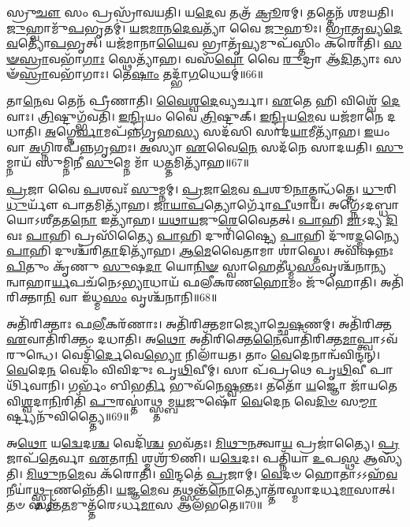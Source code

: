 𑌸𑍍𑌰𑍁\-\ul{𑌚𑍗} 𑌸𑌂 𑌪𑍍𑌰𑌸𑍍𑌰𑌾᳴𑌵𑌯𑌤𑌿।
𑌯\-\ul{𑌦𑍇}\-𑌵 𑌤𑌤𑍍𑌰᳴ \ul{𑌕𑍍𑌰𑍂}\-𑌰𑌮𑍍।
𑌤𑌤𑍍𑌤𑍇𑌨᳴ 𑌶𑌮𑌯𑌤𑌿।
\-\ul{𑌜𑍁}\-𑌹𑍍𑌵𑌾𑌮𑍁᳴\-\ul{𑌪}\-𑌭𑍃𑌤𑌮𑍍॑।
\-\ul{𑌯}\-\-\ul{𑌜}\-\-\ul{𑌮𑌾}\-\-\ul{𑌨}\-\-\ul{𑌦𑍇}\-\-\ul{𑌵}\-𑌤𑍍𑌯𑌾᳴ 𑌵𑍈 \ul{𑌜𑍁}\-𑌹𑍂𑌃।
\-\ul{𑌭𑍍𑌰𑌾}\-\-\ul{𑌤𑍃}\-\-\ul{𑌵𑍍𑌯}\-\-\ul{𑌦𑍇}\-\-\ul{𑌵}\-𑌤𑍍𑌯𑍋᳴\-\ul{𑌪}\-𑌭𑍃𑌤𑍍।
𑌯𑌜᳴𑌮𑌾𑌨𑌾\-\ul{𑌯𑍈}\-𑌵 𑌭𑍍𑌰𑌾𑌤𑍃᳴\-\ul{𑌵𑍍𑌯}\-𑌮𑍁𑌪᳴𑌸𑍍𑌤𑌿𑌂 𑌕𑌰𑍋𑌤𑌿।
\-\ul{𑌸}\-\-\ul{𑍟}\-\-\ul{𑌸𑍍𑌰𑌾}\-𑌵𑌭𑌾᳴\-\ul{𑌗𑌾𑌃} 𑌸𑍍𑌥𑍇𑌤𑍍𑌯𑌾᳴𑌹।
𑌵𑌸᳴\-\ul{𑌵𑍋} 𑌵𑍈 \ul{𑌰𑍁}\-𑌦𑍍𑌰𑌾 𑌆᳴\-\ul{𑌦𑌿}\-𑌤𑍍𑌯𑌾𑌃 𑌸𑍟᳴\-\ul{𑌸𑍍𑌰𑌾}\-𑌵𑌭𑌾᳴𑌗𑌾𑌃।
𑌤𑍇\-\ul{𑌷𑌾𑌂} 𑌤𑌦𑍍𑌭𑌾᳴\-\ul{𑌗}\-𑌧𑍇𑌯𑌮𑍍॑॥66॥

𑌤𑌾\-\ul{𑌨𑍇}\-𑌵 𑌤𑍇𑌨᳴ 𑌪𑍍𑌰𑍀𑌣𑌾𑌤𑌿।
\-\ul{𑌵𑍈}\-\-\ul{𑌶𑍍𑌵}\-\-\ul{𑌦𑍇}\-𑌵𑍍𑌯𑌰𑍍𑌚𑌾।
\-\ul{𑌏}\-𑌤𑍇 𑌹𑌿 𑌵𑌿𑌶𑍍𑌵𑍇᳴ \ul{𑌦𑍇}\-𑌵𑌾𑌃।
\-\ul{𑌤𑍍𑌰𑌿}\-𑌷𑍍𑌟𑍁𑌗𑍍𑌭᳴𑌵𑌤𑌿।
\-\ul{𑌇}\-\-\ul{𑌨𑍍𑌦𑍍𑌰𑌿}\-𑌯𑌂 𑌵𑍈 \ul{𑌤𑍍𑌰𑌿}\-𑌷𑍍𑌟𑍁𑌕𑍍।
\-\ul{𑌇}\-\-\ul{𑌨𑍍𑌦𑍍𑌰𑌿}\-𑌯\-\ul{𑌮𑍇}\-𑌵 𑌯𑌜᳴𑌮𑌾𑌨𑍇 𑌦𑌧𑌾𑌤𑌿।
\-\ul{𑌅}\-𑌗𑍍𑌨𑍇\-\ul{𑌰𑍍𑌵𑌾}\-𑌮𑌪᳴𑌨𑍍𑌨𑌗𑍃𑌹\-\ul{𑌸𑍍𑌯} 𑌸𑌦᳴𑌸𑌿 𑌸𑌾𑌦\-\ul{𑌯𑌾}\-𑌮𑍀𑌤𑍍𑌯𑌾᳴𑌹।
\-\ul{𑌇}\-𑌯𑌂 𑌵𑌾 \ul{𑌅}\-𑌗𑍍𑌨𑌿𑌰𑌪᳴𑌨𑍍𑌨𑌗𑍃𑌹𑌃।
\-\ul{𑌅}\-𑌸𑍍𑌯𑌾 \ul{𑌏}\-𑌵𑍈\-\ul{𑌨𑍇} 𑌸𑌦᳴𑌨𑍇 𑌸𑌾𑌦𑌯𑌤𑌿।
\-\ul{𑌸𑍁}\-𑌮𑍍𑌨𑌾𑌯᳴ 𑌸𑍁𑌮𑍍𑌨𑌿𑌨𑍀 \ul{𑌸𑍁}\-𑌮𑍍𑌨𑍇 𑌮𑌾᳴ 𑌧\-\ul{𑌤𑍍𑌤}\-𑌮𑌿𑌤𑍍𑌯𑌾᳴𑌹॥67॥

\-\ul{𑌪𑍍𑌰}\-𑌜𑌾 𑌵𑍈 \ul{𑌪}\-𑌶𑌵𑌃᳴ \ul{𑌸𑍁}\-𑌮𑍍𑌨𑌮𑍍।
\-\ul{𑌪𑍍𑌰}\-𑌜𑌾\-\ul{𑌮𑍇}\-𑌵 \ul{𑌪}\-𑌶𑍂\-\ul{𑌨𑌾}\-𑌤𑍍𑌮𑌨𑍍𑌧᳴𑌤𑍍𑌤𑍇।
\-\ul{𑌧𑍁}\-𑌰𑌿 \ul{𑌧𑍁}\-𑌰𑍍𑌯𑍗᳴ 𑌪𑌾\-\ul{𑌤}\-𑌮𑌿𑌤𑍍𑌯𑌾᳴𑌹।
\-\ul{𑌜𑌾}\-\-\ul{𑌯𑌾}\-\-\ul{𑌪}\-𑌤𑍍𑌯𑍋𑌰𑍍𑌗𑍋᳴\-\ul{𑌪𑍀}\-𑌥𑌾𑌯᳴।
𑌅𑌗𑍍𑌨𑍇᳴\-𑌽𑌦𑌬𑍍𑌧𑌾𑌯𑍋\-𑌽𑌶𑍀𑌤𑌤\-\ul{𑌨𑍋} 𑌇𑌤𑍍𑌯𑌾᳴𑌹।
\-\ul{𑌯}\-\-\ul{𑌥𑌾}\-\-\ul{𑌯}\-𑌜𑍁\-\ul{𑌰𑍇}\-𑌵𑍈𑌤𑌤𑍍।
\-\ul{𑌪𑌾}\-𑌹𑌿 \ul{𑌮𑌾}\-𑌽𑌦𑍍𑌯 \ul{𑌦𑌿}\-𑌵𑌃 \ul{𑌪𑌾}\-𑌹𑌿 𑌪𑍍𑌰𑌸𑌿᳴𑌤𑍍𑌯𑍈 \ul{𑌪𑌾}\-𑌹𑌿 𑌦𑍁𑌰𑌿᳴𑌷𑍍𑌟𑍍𑌯𑍈 \ul{𑌪𑌾}\-𑌹𑌿 𑌦𑍁᳴𑌰\-\ul{𑌦𑍍𑌮}\-𑌨𑍍𑌯𑍈 \ul{𑌪𑌾}\-𑌹𑌿 𑌦𑍁𑌶𑍍𑌚᳴𑌰𑌿\-\ul{𑌤𑌾}\-𑌦𑌿𑌤𑍍𑌯𑌾᳴𑌹।
\-\ul{𑌆}\-\-\-\ul{𑌮𑍇}\-𑌵𑍈𑌤𑌾𑌮𑌾 𑌶𑌾॑𑌸𑍍𑌤𑍇।
𑌅𑌵𑌿᳴𑌷𑌨𑍍𑌨𑌃 \ul{𑌪𑌿}\-𑌤𑍁𑌂 𑌕𑍃᳴𑌣𑍁 \ul{𑌸𑍁}\-𑌷\-\ul{𑌦𑌾} 𑌯𑍋\-\ul{𑌨𑌿}\-\-\ul{𑍟} 𑌸𑍍𑌵𑌾𑌹𑍇𑌤𑍀॑𑌧𑍍𑌮\-\ul{𑌸𑌂}\-𑌵𑍃𑌶𑍍𑌚᳴𑌨𑌾𑌨𑍍𑌯𑌨𑍍𑌵𑌾𑌹𑌾\-\ul{𑌰𑍍𑌯}\-𑌪𑌚᳴𑌨𑍇\-𑌽\-\ul{𑌭𑍍𑌯𑌾}\-𑌧𑌾𑌯᳴ 𑌫𑌲𑍀𑌕𑌰𑌣\-\ul{𑌹𑍋}\-𑌮𑌂 𑌜𑍁᳴𑌹𑍋𑌤𑌿।
𑌅𑌤𑌿᳴𑌰𑌿𑌕𑍍𑌤𑌾\-\ul{𑌨𑌿} 𑌵𑌾 𑌇᳴𑌧𑍍𑌮\-\ul{𑌸𑌂} 𑌵𑍃𑌶𑍍𑌚᳴𑌨𑌾𑌨𑌿॥68॥

𑌅𑌤𑌿᳴𑌰𑌿𑌕𑍍𑌤𑌾𑌃 𑌫\-\ul{𑌲𑍀}\-𑌕𑌰᳴𑌣𑌾𑌃।
𑌅𑌤𑌿᳴𑌰𑌿𑌕𑍍𑌤𑌮𑌾𑌜𑍍𑌯𑍋𑌚𑍍𑌛𑍇\-\ul{𑌷}\-𑌣𑌮𑍍।
𑌅𑌤𑌿᳴𑌰𑌿𑌕𑍍𑌤 \ul{𑌏}\-𑌵𑌾𑌤𑌿᳴𑌰𑌿𑌕𑍍𑌤𑌂 𑌦𑌧𑌾𑌤𑌿।
𑌅\-\ul{𑌥𑍋} 𑌅𑌤𑌿᳴𑌰𑌿𑌕𑍍𑌤𑍇\-\ul{𑌨𑍈}\-𑌵𑌾𑌤𑌿᳴\-𑌰𑌿𑌕𑍍𑌤\-\-\ul{𑌮𑌾}\-𑌪𑍍𑌤𑍍𑌵𑌾𑌽𑌵᳴ 𑌰𑍁𑌨𑍍𑌧𑍇।
𑌵𑍇𑌦𑌿᳴\-\ul{𑌰𑍍𑌦𑍇}\-𑌵𑍇\-\ul{𑌭𑍍𑌯𑍋} 𑌨𑌿𑌲𑌾᳴𑌯𑌤।
𑌤𑌾𑌂 \ul{𑌵𑍇}\-𑌦𑍇𑌨𑌾𑌨𑍍𑌵᳴𑌵𑌿𑌨𑍍𑌦𑌨𑍍।
\-\ul{𑌵𑍇}\-𑌦𑍇\-\ul{𑌨} 𑌵𑍇𑌦𑌿𑌂᳴ 𑌵𑌿𑌵𑌿𑌦𑍁𑌃 𑌪𑍃\-\ul{𑌥𑌿}\-𑌵𑍀𑌮𑍍।
𑌸𑌾 𑌪᳴𑌪𑍍𑌰𑌥𑍇 𑌪𑍃\-\ul{𑌥𑌿}\-𑌵𑍀 𑌪𑌾𑌰𑍍𑌥𑌿᳴𑌵𑌾𑌨𑌿।
𑌗𑌰𑍍𑌭𑌂᳴ 𑌬𑌿𑌭\-\ul{𑌰𑍍𑌤𑌿} 𑌭𑍁𑌵᳴𑌨𑍇\-\ul{𑌷𑍍𑌵}\-𑌨𑍍𑌤𑌃।
𑌤𑌤𑍋᳴ \ul{𑌯}\-𑌜𑍍𑌞𑍋 𑌜𑌾᳴𑌯𑌤𑍇 𑌵𑌿\-\ul{𑌶𑍍𑌵}\-𑌦𑌾\-\ul{𑌨𑌿}\-𑌰𑌿𑌤𑌿᳴ \ul{𑌪𑍁}\-𑌰𑌸𑍍𑌤𑌾॑𑌥𑍍𑌸𑍍𑌤𑌮𑍍𑌬\-\ul{𑌯}\-𑌜𑍁𑌷𑍋᳴ \ul{𑌵𑍇}\-𑌦𑍇\-\ul{𑌨} 𑌵𑍇\-\ul{𑌦𑌿}\-\-\ul{𑍞} 𑌸\-\ul{𑌮𑍍𑌮𑌾}\-𑌰𑍍𑌷𑍍𑌟𑍍𑌯𑌨𑍁᳴𑌵𑌿𑌤𑍍𑌤𑍍𑌯𑍈॥69॥

𑌅\-\ul{𑌥𑍋} 𑌯\-\ul{𑌦𑍍𑌵𑍇}\-𑌦\-\ul{𑌶𑍍𑌚} 𑌵𑍇𑌦𑌿᳴\-\ul{𑌶𑍍𑌚} 𑌭𑌵᳴𑌤𑌃।
\-\ul{𑌮𑌿}\-\-\ul{𑌥𑍁}\-\-\ul{𑌨}\-𑌤𑍍𑌵𑌾\-\ul{𑌯} 𑌪𑍍𑌰𑌜𑌾॑𑌤𑍍𑌯𑍈।
\-\ul{𑌪𑍍𑌰}\-𑌜𑌾𑌪᳴\-\ul{𑌤𑍇}\-𑌰𑍍𑌵𑌾 \ul{𑌏}\-𑌤𑌾\-\ul{𑌨𑌿} 𑌶𑍍𑌮𑌶𑍍𑌰𑍂᳴𑌣𑌿।
𑌯\-\ul{𑌦𑍍𑌵𑍇}\-𑌦𑌃।
𑌪𑌤𑍍𑌨𑌿᳴𑌯𑌾 \ul{𑌉}\-𑌪\-\ul{𑌸𑍍𑌥} 𑌆𑌸𑍍𑌯᳴𑌤𑌿।
\-\ul{𑌮𑌿}\-\-\ul{𑌥𑍁}\-𑌨\-\ul{𑌮𑍇}\-𑌵 𑌕᳴𑌰𑍋𑌤𑌿।
\-\ul{𑌵𑌿}\-𑌨𑍍𑌦𑌤𑍇॑ \ul{𑌪𑍍𑌰}\-𑌜𑌾𑌮𑍍।
\-\ul{𑌵𑍇}\-𑌦𑍞 𑌹𑍋𑌤𑌾\-𑌽𑌽𑌹᳴\-\ul{𑌵}\-𑌨𑍀𑌯𑌾॑\-\ul{𑌥𑍍𑌸𑍍𑌤𑍃}\-𑌣𑌨𑍍𑌨𑍇᳴𑌤𑌿।
\-\ul{𑌯}\-𑌜𑍍𑌞\-\ul{𑌮𑍇}\-𑌵 𑌤𑌥𑍍𑌸𑌨𑍍𑌤᳴\-\ul{𑌨𑍋}\-𑌤𑍍𑌯𑍋𑌤𑍍𑌤᳴𑌰𑌸𑍍𑌮𑌾𑌦𑌰𑍍𑌧\-\-\ul{𑌮𑌾}\-𑌸𑌾𑌤𑍍।
𑌤𑍞 𑌸𑌨𑍍𑌤᳴\-\ul{𑌤}\-𑌮𑍁𑌤𑍍𑌤᳴𑌰𑍇\-𑌽𑌰𑍍𑌧\-\ul{𑌮𑌾}\-𑌸 𑌆𑌲᳴𑌭𑌤𑍇॥70॥

